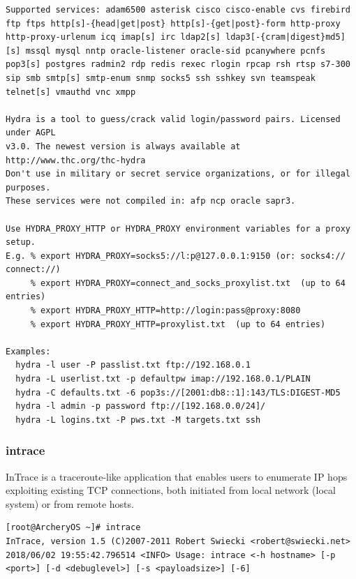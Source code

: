 \documentclass{article}
\begin{document}
\begin{lstlisting}
Supported services: adam6500 asterisk cisco cisco-enable cvs firebird ftp ftps http[s]-{head|get|post} http[s]-{get|post}-form http-proxy http-proxy-urlenum icq imap[s] irc ldap2[s] ldap3[-{cram|digest}md5][s] mssql mysql nntp oracle-listener oracle-sid pcanywhere pcnfs pop3[s] postgres radmin2 rdp redis rexec rlogin rpcap rsh rtsp s7-300 sip smb smtp[s] smtp-enum snmp socks5 ssh sshkey svn teamspeak telnet[s] vmauthd vnc xmpp

Hydra is a tool to guess/crack valid login/password pairs. Licensed under AGPL
v3.0. The newest version is always available at http://www.thc.org/thc-hydra
Don't use in military or secret service organizations, or for illegal purposes.
These services were not compiled in: afp ncp oracle sapr3.

Use HYDRA_PROXY_HTTP or HYDRA_PROXY environment variables for a proxy setup.
E.g. % export HYDRA_PROXY=socks5://l:p@127.0.0.1:9150 (or: socks4:// connect://)
     % export HYDRA_PROXY=connect_and_socks_proxylist.txt  (up to 64 entries)
     % export HYDRA_PROXY_HTTP=http://login:pass@proxy:8080
     % export HYDRA_PROXY_HTTP=proxylist.txt  (up to 64 entries)

Examples:
  hydra -l user -P passlist.txt ftp://192.168.0.1
  hydra -L userlist.txt -p defaultpw imap://192.168.0.1/PLAIN
  hydra -C defaults.txt -6 pop3s://[2001:db8::1]:143/TLS:DIGEST-MD5
  hydra -l admin -p password ftp://[192.168.0.0/24]/
  hydra -L logins.txt -P pws.txt -M targets.txt ssh
\end{lstlisting}

\subsubsection{intrace}
InTrace is a traceroute-like application that enables users to enumerate IP hops exploiting existing TCP connections, both initiated from local network (local system) or from remote hosts.
\begin{lstlisting}
[root@ArcheryOS ~]# intrace
InTrace, version 1.5 (C)2007-2011 Robert Swiecki <robert@swiecki.net>
2018/06/02 19:55:42.796514 <INFO> Usage: intrace <-h hostname> [-p <port>] [-d <debuglevel>] [-s <payloadsize>] [-6]
\end{lstlisting}
\end{document}
